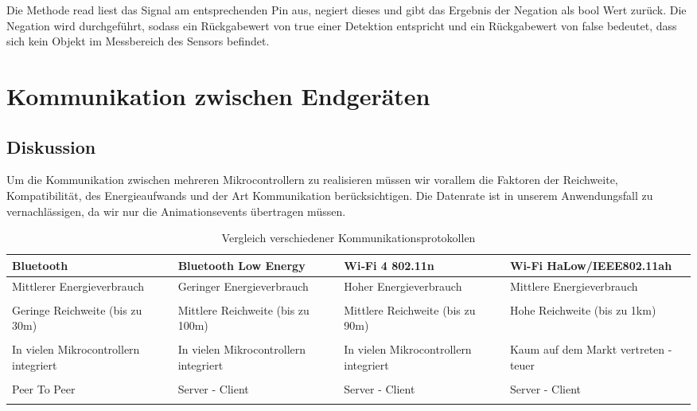         Die Methode read liest das Signal am entsprechenden Pin aus, negiert dieses und gibt das Ergebnis der Negation als bool Wert zurück. Die Negation wird durchgeführt, sodass ein Rückgabewert von true einer Detektion entspricht und ein Rückgabewert von false bedeutet, dass sich kein Objekt im Messbereich des Sensors befindet.

\section{Kommunikation zwischen Endgeräten} \label{sec:communications}

    \subsection{Diskussion}
        Um die Kommunikation zwischen mehreren Mikrocontrollern zu realisieren müssen wir vorallem die Faktoren der Reichweite, Kompatibilität, des Energieaufwands und der Art Kommunikation berücksichtigen. Die Datenrate ist in unserem Anwendungsfall zu vernachlässigen, da wir nur die Animationsevents übertragen müssen.

        \begin{table}[H]
            \caption{Vergleich verschiedener Kommunikationsprotokollen}
            \centering
            \begin{tabularx}{\textwidth}{  X | X | X | X }
                \textbf{Bluetooth} & \textbf{Bluetooth Low Energy} & \textbf{Wi‑Fi 4 802.11n} & \textbf{Wi-Fi HaLow/IEEE802.11ah} \\ [0.5ex] \hline\hline
                Mittlerer Energieverbrauch &
                Geringer Energieverbrauch &
                Hoher Energieverbrauch &
                Mittlere Energieverbrauch \\
                &&\\
                Geringe Reichweite (bis zu 30m) &
                Mittlere Reichweite (bis zu 100m) &
                Mittlere Reichweite (bis zu 90m) &
                Hohe Reichweite (bis zu 1km) \\
                &&\\
                In vielen Mikrocontrollern integriert &
                In vielen Mikrocontrollern integriert &
                In vielen Mikrocontrollern integriert &
                Kaum auf dem Markt vertreten - teuer \\
                &&\\
                Peer To Peer &
                Server - Client &
                Server - Client &
                Server - Client \\
                &&\\
            \end{tabularx}
            \label{tab:compare_mics}
        \end{table}


